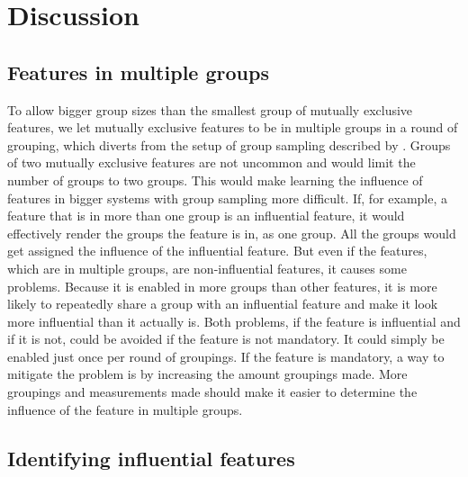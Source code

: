 \documentclass[../thesis.tex]{subfiles}
\begin{document}
\chapter{Discussion}\label{chapter:discuss}

\section{Features in multiple groups} \label{sec:discussion:mutually_exclusive_group_size}

To allow bigger group sizes than the smallest group of mutually exclusive features,
we let mutually exclusive features to be in multiple groups in a round of grouping, which diverts 
from the setup of group sampling described by \citeauthor{saltelli2008global}.
Groups of two mutually exclusive features are not uncommon and would limit the
number of groups to two groups. This would make learning the influence of features
in bigger systems with group sampling more difficult.
If, for example, a feature that is in more than one group is an influential feature,
it would effectively render the groups the feature is in, as one group.
All the groups would get assigned the influence of the influential feature.
But even if the features, which are in multiple groups, are non-influential features,
it causes some problems. Because it is enabled in more groups than
other features, it is more likely to repeatedly share a group with an influential feature
and make it look more influential than it actually is.
Both problems, if the feature is influential and if it is not, could be avoided if
the feature is not mandatory. It could simply be enabled just once per round of groupings.
If the feature is mandatory, a way to mitigate the problem is by increasing the amount
groupings made. More groupings and measurements made should make it easier to
determine the influence of the feature in multiple groups.


\section{Identifying influential features} \label{sec:discussion:mutually_exclusive_group_size}
\end{document}

